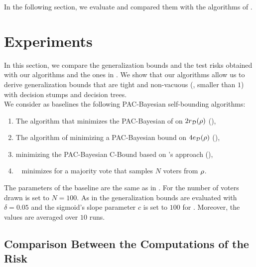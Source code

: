 In the following section, we evaluate  and compared them with the algorithms of .

\section{Experiments}
\label{chap:mv-sto:sec:expe}

In this section, we compare the generalization bounds and the test risks obtained with our algorithms and the ones in .
We show that our algorithms allow us to derive generalization bounds that are tight and non-vacuous (\ie, smaller than $1$) with decision stumps and decision trees.\\

We consider as baselines the following PAC-Bayesian self-bounding algorithms: 
\begin{enumerate}[label={\it (\roman*)}]
    \item The algorithm \algogermain that minimizes the PAC-Bayesian of \citet[PAC-Bound 0]{GermainLacasseLavioletteMarchandRoy2015} on $2r_{\mathcal{D}}(\rho)$ (),
    \item The algorithm \algomasegosa of \citet{MasegosaLorenzenIgelSeldin2020} minimizing a PAC-Bayesian bound on $4e_{\mathcal{D}}(\rho)$ (),
    \item {} minimizing the PAC-Bayesian C-Bound based on \citeauthor{Seeger2002}'s approach (),
    \item \algolacasse~\citep{LacasseLavioletteMarchandTurgeonBoutin2010} minimizes  for a majority vote that samples $N$ voters from $\rho$.
\end{enumerate}

The parameters of the baseline are the same as in .
For \algolacasse the number of voters drawn is set to $N{=}100$.
As in  the generalization bounds are evaluated with $\delta=0.05$ and the sigmoid's slope parameter $c$ is set to $100$ for .
Moreover, the values are averaged over $10$ runs.

\subsection{Comparison Between the Computations of the Risk}
\label{chap:mv-sto:sec:exact-mc}

